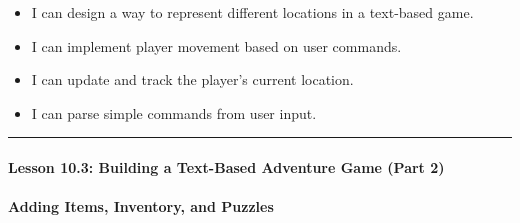\documentclass[
  justified,
  openright,
]{tufte-book}
\let\subsection\paragraph
\let\paragraph\paragraph
\let\subsection\paragraph
\let\paragraph\paragraph
\providecommand{\tightlist}{%
  \setlength{\itemsep}{0pt}\setlength{\parskip}{0pt}}
\begin{document}
\begin{itemize}
\tightlist
\item[$\square$]
  I can design a way to represent different locations in a text-based
  game.
\item[$\square$]
  I can implement player movement based on user commands.
\item[$\square$]
  I can update and track the player's current location.
\item[$\square$]
  I can parse simple commands from user input.
\end{itemize}

\begin{center}\rule{0.5\linewidth}{0.5pt}\end{center}

\subsection{Lesson 10.3: Building a Text-Based Adventure Game (Part
2)}\label{lesson-10.3-building-a-text-based-adventure-game-part-2}

\subsection{Adding Items, Inventory, and
Puzzles}\label{adding-items-inventory-and-puzzles}
\end{document}
